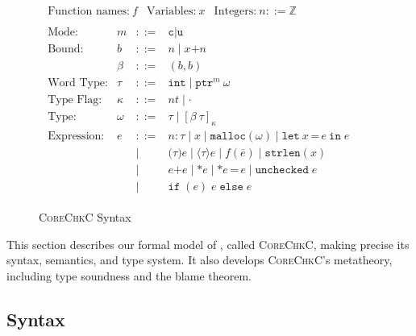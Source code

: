 \documentclass[conference]{IEEEtran}
\newcommand{\lang}{\textsc{CoreChkC}\xspace}
\newcommand{\checkedc}{\text{Checked C}\xspace}
\newcommand{\kw}[1]{\ensuremath{\mathtt{#1}}}
\newcommand{\estrlen}[1]{\ensuremath{\kw{strlen}({#1})}}
\newcommand{\tallarrayb}[2]{\ensuremath{[{#1}~{#2}]_{\kappa}}}
\newcommand{\tptr}[2]{\ensuremath{\mathtt{ptr}^{#2}~{#1}}}
\newcommand{\evalue}[2]{\ensuremath{{#1}\!:\!{#2}}}
\newcommand{\emalloc}[1]{\ensuremath{\kw{malloc}({#1})}}
\newcommand{\ecall}[2]{\ensuremath{{#1}({#2})}}
\newcommand{\ecast}[2]{\ensuremath{\kw{(}{#1}\kw{)}{#2}}}
\newcommand{\edyncast}[2]{\ensuremath{\langle{#1}\rangle{#2}}}
\newcommand{\elet}[3]{\ensuremath{\kw{let}~#1\, \texttt{=}\, #2~\kw{in}\;{#3}}}
\newcommand{\ebinop}[2]{\ensuremath{#1 \plus #2}}
\newcommand{\eassign}[2]{\ensuremath{\texttt{*}{#1}\,\texttt{=}\, {#2}}}
\newcommand{\estar}[1]{\ensuremath{\texttt{*}{#1}}}
\newcommand{\eunchecked}[1]{\ensuremath{\kw{unchecked}\;{#1}}}
\newcommand{\eif}[3]{\ensuremath{\kw{if\;}(#1)\;{#2}\;\kw{else}\;{#3}}}
\newcommand{\tint}{\ensuremath{\mathtt{int}}}
\newcommand{\plus}{\mathbin{\texttt{+}}}
\newcommand{\cmode}{\texttt{c}}
\newcommand{\umode}{\texttt{u}}
\newcommand{\bvar}{\ensuremath{\beta}}
\providecommand{\DIFdelend}{} %
\DeclareRobustCommand{\DIFdelend}{\DIFOaddend \let\includegraphics\DIFOincludegraphics} %
\begin{document}
\DIFdelend \begin{figure}
  \small \centering
  $\begin{array}{l}
\begin{array}{lll}
\text{Function names:}~f&
       \text{Variables:}~ x
& \text{Integers:}~n::=\mathbb{Z} 
\end{array}
\\[0.5em]

\begin{array}{llcllcl}

\text{Mode:} & m & ::= & \cmode \mid \umode \\[0.5em]

\text{Bound:} & b & ::= & n \mid x \plus n \\
              & \bvar & ::= & (b,b) \\[0.5em]

     \text{Word Type:}& \tau &::=& \tint\mid \tptr{\omega}{m}
\\[0.5em]

\text{Type Flag:}&\kappa &::=& nt \mid \cdot
\\[0.5em]

\text{Type:}&\omega &::=& \tau \mid \tallarrayb{\bvar}{\tau}
\\[0.5em]

\text{Expression:}& e & ::= & 
\evalue{n}{\tau} \mid x \mid \emalloc{\omega} \mid\elet{x}{e}{e} \\[0.2em]
&&\mid&
\ecast{\tau}{e} \mid \edyncast{\tau}{e}\mid \ecall{f}{\overline{e}} \mid \estrlen{x} \\[0.2em]
&&\mid&
\ebinop{e}{e} \mid\estar{e}\mid\eassign{e}{e}\mid\eunchecked{e}
\\[0.2em]
&&\mid&\eif{e}{e}{e}
\end{array}
    \end{array}
  $
  \caption{\lang Syntax}
  \label{fig:checkc-syn}
\end{figure}





This section describes our formal model of \checkedc, called
\lang, making precise its syntax, semantics, and type system. It also
develops \lang's metatheory, including type soundness and the blame
theorem.

\subsection{Syntax}\label{sec:syntax}
\end{document}
